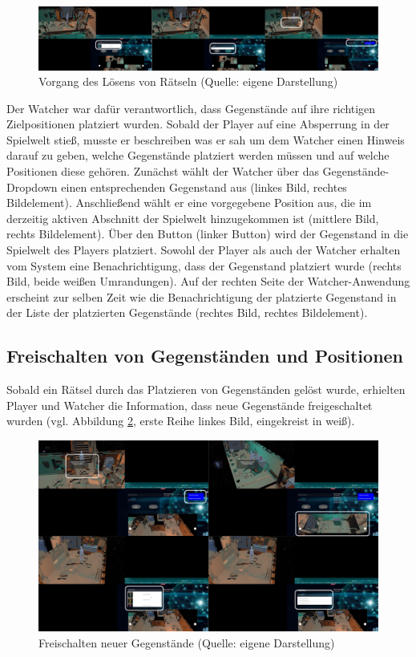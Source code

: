 \begin{figure}[ht]
\centering
\includegraphics[width=1\linewidth]{content/pictures/HowToSolve.png}
\caption{Vorgang des Lösens von Rätseln (Quelle: eigene Darstellung)}
\label{fig:old-solving-riddle}
\end{figure}

Der Watcher war dafür verantwortlich, dass Gegenstände auf ihre richtigen Zielpositionen platziert wurden. Sobald der Player auf eine Absperrung in der Spielwelt stieß, musste er beschreiben was er sah um dem Watcher einen Hinweis darauf zu geben, welche Gegenstände platziert werden müssen und auf welche Positionen diese gehören. Zunächst wählt der Watcher über das Gegenstände-Dropdown einen entsprechenden Gegenstand aus (linkes Bild, rechtes Bildelement). Anschließend wählt er eine vorgegebene Position aus, die im derzeitig aktiven Abschnitt der Spielwelt hinzugekommen ist (mittlere Bild, rechts Bildelement). Über den Button  (linker Button) wird der Gegenstand in die Spielwelt des Players platziert. Sowohl der Player als auch der Watcher erhalten vom System eine Benachrichtigung, dass der Gegenstand platziert wurde (rechts Bild, beide weißen Umrandungen). Auf der rechten Seite der Watcher-Anwendung erscheint zur selben Zeit wie die Benachrichtigung der platzierte Gegenstand in der Liste der platzierten Gegenstände (rechtes Bild, rechtes Bildelement). 

\subsection{Freischalten von Gegenständen und Positionen}
Sobald ein Rätsel durch das Platzieren von Gegenständen gelöst wurde, erhielten Player und Watcher die Information, dass neue Gegenstände freigeschaltet wurden (vgl. Abbildung \ref{fig:old-unlock-system}, erste Reihe linkes Bild, eingekreist in weiß). 

\begin{figure}[ht]
\centering
\includegraphics[width=1\linewidth]{content/pictures/UnlockMore.png}
\caption{Freischalten neuer Gegenstände (Quelle: eigene Darstellung)}
\label{fig:old-unlock-system}
\end{figure}

